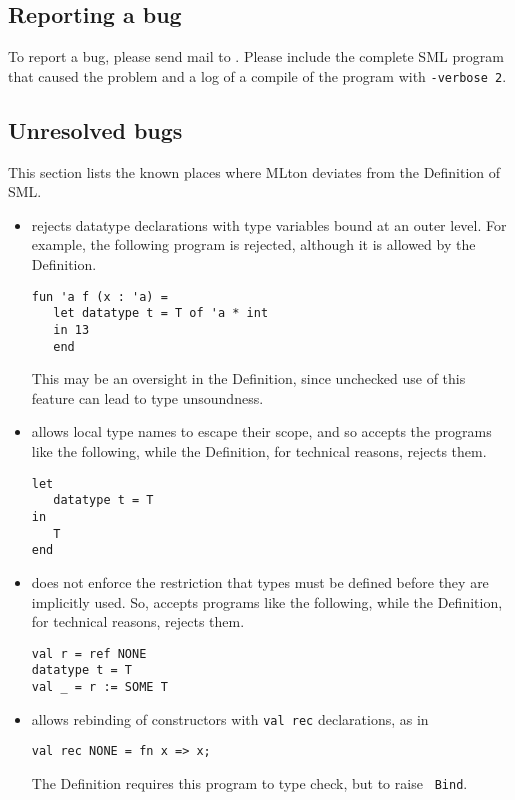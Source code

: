 %
\subsection{Reporting a bug}

To report a bug, please send mail to {\mltonmail}.  Please include the
complete SML program that caused the problem and a log of a compile of
the program with {\tt -verbose 2}.
%
\subsection{Unresolved bugs}

This section lists the known places where MLton deviates from the
Definition of SML.

\begin{itemize}

\item
{\mlton} rejects datatype declarations with type variables bound at
an outer level.  For example, the following program is rejected,
although it is allowed by the Definition.
\begin{verbatim}
fun 'a f (x : 'a) =
   let datatype t = T of 'a * int
   in 13
   end
\end{verbatim}
This may be an oversight in the Definition, since unchecked use of
this feature can lead to type unsoundness.

\item
{\mlton} allows local type names to escape their scope, and so accepts
the programs like the following, while the Definition, for technical
reasons, rejects them.
\begin{verbatim}
let
   datatype t = T
in
   T
end
\end{verbatim}

\item
{\mlton} does not enforce the restriction that types must be defined
before they are implicitly used.  So, {\mlton} accepts programs like
the following, while the Definition, for technical reasons, rejects
them.
\begin{verbatim}
val r = ref NONE
datatype t = T
val _ = r := SOME T
\end{verbatim}
%
\item
{\mlton} allows rebinding of constructors with {\tt val rec}
declarations, as in
\begin{verbatim}
val rec NONE = fn x => x;
\end{verbatim}
The Definition requires this program to type check, but to raise {\tt
Bind}.


\end{itemize}
